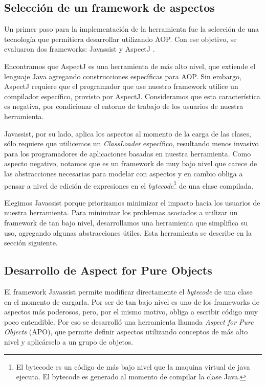 
\subsection{Selección de un framework de aspectos}  
		Un primer paso para la implementación de la herramienta fue la selección de una
		tecnología que permitiera desarrollar utilizando AOP.
		Con ese objetivo, se evaluaron dos frameworks: Javassist
		\cite{chiba00loadtime} y AspectJ \cite{KiczalesHHKPG01}.
	
	\medskip 
	Encontramos que AspectJ es una herramienta de más alto nivel, que extiende
	el lenguaje Java agregando construcciones específicas para AOP.
	Sin embargo, AspectJ requiere que el programador que use nuestro framework
	utilice un compilador específico, provisto por AspectJ. 
	Consideramos que esta característica es negativa, por condicionar el
	entorno de trabajo de los usuarios de nuestra herramienta.
	
	Javassist, por su lado, aplica los aspectos al momento de
	la carga de las clases, sólo requiere que utilicemos un \emph{ClassLoader}
	específico, resultando menos invasivo para los programadores de aplicaciones
	basadas en nuestra herramienta.
	Como aspecto negativo, notamos que es un framework de muy bajo nivel que
	carece de las abstracciones necesarias para modelar con aspectos y en cambio
	obliga a pensar a nivel de edición de expresiones en el \emph{bytecode}\footnote{
	El bytecode es un código de más bajo nivel que la maquina virtual de java ejecuta. El bytecode es generado al
	momento de compilar la clase Java.} 
	de una clase compilada.
	
	Elegimos Javassist porque priorizamos minimizar el impacto hacia los usuarios
	de nuestra herramienta.
	Para minimizar los problemas asociados a utilizar un framework de tan bajo
	nivel, desarrollamos una herramienta que simplifica su uso, agregando algunas
	abstracciones útiles. Esta herramienta se describe en la sección siguiente.

\subsection{Desarrollo de Aspect for Pure Objects}
	El framework Javassist permite modificar directamente el \emph{bytecode} de
	una clase en el momento de cargarla.
	Por ser de tan bajo nivel es uno de los frameworks de aspectos más poderosos,
	pero, por el mismo motivo, obliga a escribir código muy poco entendible.
	Por eso se desarrolló una herramienta llamada \emph{Aspect for Pure Objects} (APO), 
	que permite definir aspectos utilizando conceptos de más alto nivel y
	aplicárselo a un grupo de objetos. 
	

